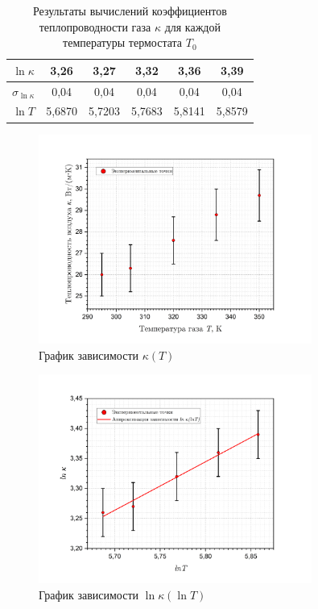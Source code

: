 \documentclass[a4paper, 12pt]{article}
\begin{document}
\begin{table}[H]
\begin{tabular}{|c|ccccc|}
                $\ln \kappa$ & \multicolumn{1}{c|}{3,26}   & \multicolumn{1}{c|}{3,27}   & \multicolumn{1}{c|}{3,32}   & \multicolumn{1}{c|}{3,36}   & 3,39   \\ \hline
                
                $\sigma_{\ln \kappa}$ & \multicolumn{1}{c|}{0,04} & \multicolumn{1}{c|}{0,04} & \multicolumn{1}{c|}{0,04} & \multicolumn{1}{c|}{0,04} & 0,04 \\ \hline
                
                $\ln T$ & \multicolumn{1}{c|}{5,6870} & \multicolumn{1}{c|}{5,7203} & \multicolumn{1}{c|}{5,7683} & \multicolumn{1}{c|}{5,8141} & 5,8579 \\ \hline
            \end{tabular}
            \caption{Результаты вычислений коэффициентов теплопроводности газа $\kappa$ для каждой температуры термостата $T_0$}
            \label{table:results_3}
        \end{table}

        \begin{figure}[H]
            \centering
            \includegraphics[width=0.8\textwidth]{images/Kappa(T).png}
            \caption{График зависимости $\kappa (T)$} 
            \label{graph:kappa}
        \end{figure}

        \begin{figure}[H]
            \centering
            \includegraphics[width=0.8\textwidth]{images/lnK(lnT).png}
            \caption{График зависимости $\ln \kappa (\ln T)$} 
            \label{graph:approxKappa}
        \end{figure}
\end{document}
